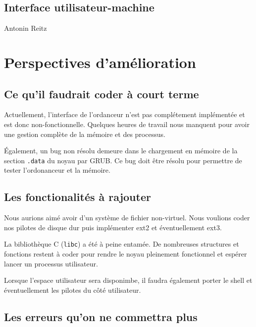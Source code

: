 \documentclass[a4paper,11pt]{article}
\begin{document}
\subsection{Interface utilisateur-machine}

Antonin Reitz

\section{Perspectives d'amélioration}

\subsection{Ce qu'il faudrait coder à court terme}

Actuellement, l'interface de l'ordanceur n'est pas complétement implémentée et
est donc non-fonctionnelle. Quelques heures de travail nous manquent pour avoir
une gestion complète de la mémoire et des processus.

Également, un bug non résolu demeure dans le chargement en mémoire de la section
\texttt{.data} du noyau par GRUB. Ce bug doit être résolu pour permettre de
tester l'ordonanceur et la mémoire.

\subsection{Les fonctionalités à rajouter}

Nous aurions aimé avoir d'un système de fichier non-virtuel. Nous voulions coder
nos pilotes de disque dur puis implémenter ext2 et éventuellement ext3.

La bibliothèque C (\texttt{libc}) a été à peine entamée. De nombreuses
structures et fonctions restent à coder pour rendre le noyau pleinement
fonctionnel et espérer lancer un processus utilisateur.

Lorsque l'espace utilisateur sera disponimbe, il faudra également porter le
shell et éventuellement les pilotes du côté utilisateur.

\subsection{Les erreurs qu'on ne commettra plus}
\end{document}
